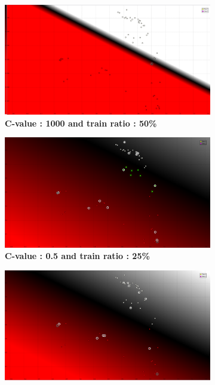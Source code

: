 \begin{figure}[ht]
\centering
\begin{subfigure}[t]{0.2\textwidth}
\includegraphics[height=0.08\textheight]{./classification/SVM_linear_c_1000_TR_50_.png}
\caption{\bf C-value : 1000 and train ratio : 50\%}
\label{fig:SVM_linear_C_value_1000}
\end{subfigure}
\hfill
\begin{subfigure}[t]{0.2\textwidth}
\includegraphics[height=0.08\textheight]{./classification/SVM_linear_c_0_5_TR_25_.png}
\caption{\bf C-value : 0.5 and train ratio : 25\%}
\end{subfigure}%
\hfill
\begin{subfigure}[t]{0.2\textwidth}
\includegraphics[height=0.08\textheight]{./classification/SVM_linear_c_1_TR_25_.png}

\end{subfigure}
\end{figure}
